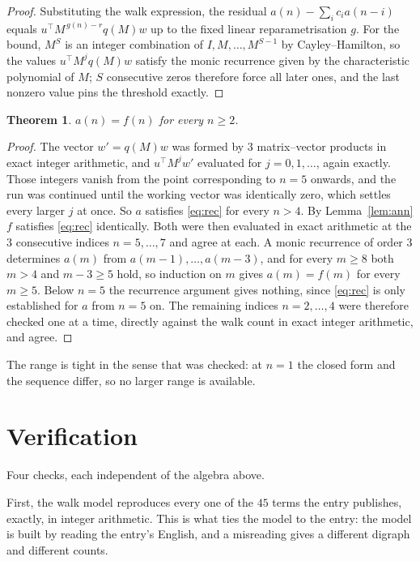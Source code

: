 \documentclass[11pt,a4paper]{article}
\theoremstyle{plain}
\newtheorem{theorem}{Theorem}
\theoremstyle{definition}
\begin{document}
\begin{proof}
Substituting the walk expression, the residual $a(n)-\sum_ic_ia(n-i)$ equals
$u^{\!\top}M^{\,g(n)-r}q(M)w$ up to the fixed linear reparametrisation $g$. For the bound,
$M^{S}$ is an integer combination of $I,M,\dots,M^{S-1}$ by Cayley--Hamilton, so the values
$u^{\!\top}M^{j}q(M)w$ satisfy the monic recurrence given by the characteristic polynomial of
$M$; $S$ consecutive zeros therefore force all later ones, and the last nonzero value pins the
threshold exactly.
\end{proof}

\begin{theorem}
$a(n)=f(n)$ for every $n\ge2$.
\end{theorem}

\begin{proof}
The vector $w'=q(M)w$ was formed by $3$ matrix--vector products in exact integer
arithmetic, and $u^{\!\top}M^{j}w'$ evaluated for $j=0,1,\dots$, again exactly. Those integers
vanish from the point corresponding to $n=5$ onwards, and the run was continued until the
working vector was identically zero, which settles every larger $j$ at once. So $a$ satisfies
\eqref{eq:rec} for every $n>4$. By Lemma~\ref{lem:ann} $f$ satisfies \eqref{eq:rec}
identically. Both were then evaluated in exact arithmetic at the $3$ consecutive indices
$n=5,\dots,7$ and agree at each. A monic recurrence of order $3$
determines $a(m)$ from $a(m-1),\dots,a(m-3)$, and for every $m\ge8$ both
$m>4$ and $m-3\ge5$ hold, so induction on $m$ gives $a(m)=f(m)$ for every
$m\ge5$.
Below $n=5$ the recurrence argument gives nothing, since \eqref{eq:rec} is only
established for $a$ from $n=5$ on. The remaining indices $n=2,\dots,4$ were
therefore checked one at a time, directly against the walk count in exact integer arithmetic,
and agree.
\end{proof}

The range is tight in the sense that was checked: at $n=1$ the closed form and the sequence differ, so no larger range is available.

\section{Verification}

Four checks, each independent of the algebra above.

First, the walk model reproduces every one of the $45$ terms the entry publishes,
exactly, in integer arithmetic. This is what ties the model to the entry: the model is built
by reading the entry's English, and a misreading gives a different digraph and different
counts.
\end{document}
